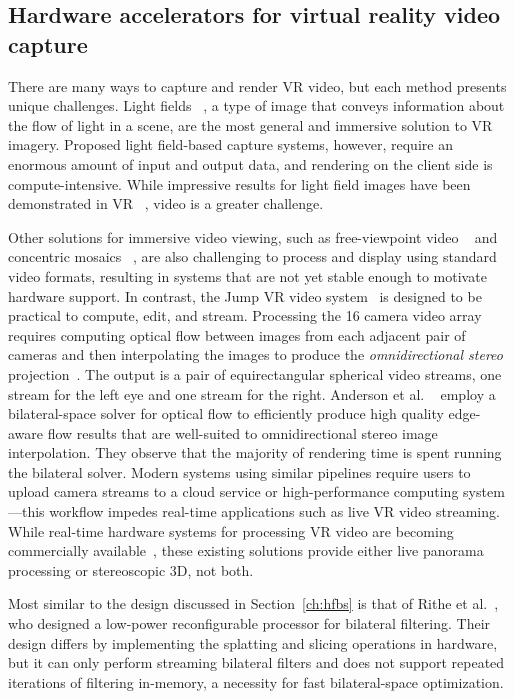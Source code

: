 \subsection{Hardware accelerators for virtual reality video capture}
\label{sec:related:vr-hw}

There are many ways to capture and render VR video, but each method presents unique challenges.
Light fields ~\cite{levoy1996light}, a type of image that conveys information about the flow of light in a scene, are the most general and immersive solution to VR imagery.
Proposed light field-based capture systems, however, require an enormous amount of input and output data, and rendering on the client side is compute-intensive.
While impressive results for light field images have been demonstrated in VR ~\cite{Huang2015}, video is a greater challenge.

Other solutions for immersive video viewing, such as free-viewpoint video ~\cite{carranza2003free} and concentric mosaics ~\cite{shum2005virtual}, are also challenging to process and display using standard video formats, resulting in systems that are not yet stable enough to motivate hardware support.
In contrast, the Jump VR video system~\cite{googlejump} is designed to be practical to compute, edit, and stream.
Processing the 16 camera video array requires computing optical flow between images from each adjacent pair of cameras and then interpolating the images to produce the \emph{omnidirectional stereo} projection~\cite{peleg2001}.
The output is a pair of equirectangular spherical video streams, one stream for the left eye and one stream for the right.
Anderson et al. ~\cite{googlejump} employ a bilateral-space solver for optical flow to efficiently produce high quality edge-aware flow results that are well-suited to omnidirectional stereo image interpolation.
They observe that the majority of rendering time is spent running the bilateral solver.
Modern systems using similar pipelines require users to upload camera streams to a cloud service or high-performance computing system---this workflow impedes real-time applications such as live VR video streaming.
While real-time hardware systems for processing VR video are becoming commercially available~\cite{gopro,sphere,vahana}, these existing solutions provide either live panorama processing or stereoscopic 3D, not both.

Most similar to the design discussed in Section~\ref{ch:hfbs} is that of Rithe et al.~\cite{bilat_isscc}, who designed a low-power reconfigurable processor for bilateral filtering.
Their design differs by implementing the splatting and slicing operations in hardware, but it can only perform streaming bilateral filters and does not support repeated iterations of filtering in-memory, a necessity for fast bilateral-space optimization.

